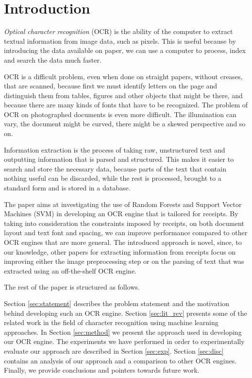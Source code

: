 \chapter{Introduction}
\textit{Optical character recognition} (OCR) is the ability of the computer to extract textual information from image data, such as pixels\cite{schantz1982history}. This is useful because by introducing the data available on paper, we can use a computer to process, index and search the data much faster.  

OCR is a difficult problem, even when done on straight papers, without creases, that are scanned, because first we must identify letters on the page and distinguish them from tables, figures and other objects that might be there, and because there are many kinds of fonts that have to be recognized. The problem of OCR on photographed documents is even more difficult. The illumination can vary, the document might be curved, there might be a skewed perspective and so on. 

Information extraction is the process of taking raw, unstructured text and outputting information that is parsed and structured. This makes it easier to search and store the necessary data, because parts of the text that contain nothing useful can be discarded, while the rest is processed, brought to a standard form and is stored in a database. 

The paper aims at investigating the use of Random Forests\cite{breiman2001random} and Support Vector Machines (SVM)\cite{Cortes_1995} in developing an OCR engine that is tailored for receipts. By taking into consideration the constraints imposed by receipts, on both document layout and text font and spacing, we can improve performance compared to other OCR engines that are more general. The introduced approach is novel, since, to our knowledge, other papers for extracting information from receipts focus on improving either the image preprocessing step or on the parsing of text that was extracted using an off-the-shelf OCR engine.

The rest of the paper is structured as follows.

Section \ref{sec:statement} describes the problem statement and the motivation behind developing such an OCR engine. Section \ref{sec:lit_rev} presents some of the related work in the field of character recognition using machine learning approaches. In Section \ref{sec:method} we present the approach used in developing our OCR engine. The experiments we have performed in order to experimentally evaluate our approach are described in Section \ref{sec:exp}. Section \ref{sec:disc} contains an analysis of our approach and a comparison to other OCR engines. Finally, we provide conclusions and pointers towards future work. 